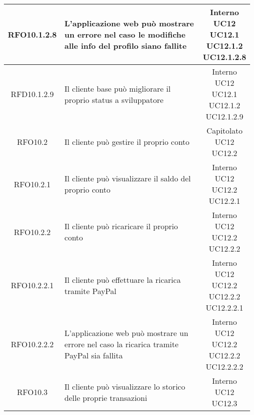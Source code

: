 \begin{longtable}{|c|p{8cm}|c|}
\hline
\hypertarget{RFO10.1.2.8}{RFO10.1.2.8} & L'applicazione web può mostrare un errore nel caso le modifiche alle info del profilo siano fallite & \makecell*{Interno\\UC12\\UC12.1\\UC12.1.2\\UC12.1.2.8} \\
\hline
\hypertarget{RFD10.1.2.9}{RFD10.1.2.9} & Il cliente base può migliorare il proprio status a sviluppatore & \makecell*{Interno\\UC12\\UC12.1\\UC12.1.2\\UC12.1.2.9} \\
\hline
\hypertarget{RFO10.2}{RFO10.2} & Il cliente può gestire il proprio conto &\makecell*{Capitolato\\UC12\\UC12.2} \\
\hline

\hypertarget{RFO10.2.1}{RFO10.2.1} & Il cliente può visualizzare il saldo del proprio conto & \makecell*{Interno\\UC12\\UC12.2\\UC12.2.1} \\
\hline
\hypertarget{RFO10.2.2}{RFO10.2.2} & Il cliente può ricaricare il proprio conto & \makecell*{Interno\\UC12\\UC12.2\\UC12.2.2} \\
\hline

\hypertarget{RFO10.2.2.1}{RFO10.2.2.1} & Il cliente può effettuare la ricarica tramite PayPal & \makecell*{Interno\\UC12\\UC12.2\\UC12.2.2\\UC12.2.2.1} \\
\hline

\hypertarget{RFO10.2.2.2}{RFO10.2.2.2} & L'applicazione web può mostrare un errore nel caso la ricarica tramite PayPal sia fallita & \makecell*{Interno\\UC12\\UC12.2\\UC12.2.2\\UC12.2.2.2} \\
\hline

\hypertarget{RFO10.3}{RFO10.3} & Il cliente può visualizzare lo storico delle proprie transazioni & \makecell*{Interno\\UC12\\UC12.3} \\
\hline


\end{longtable}

